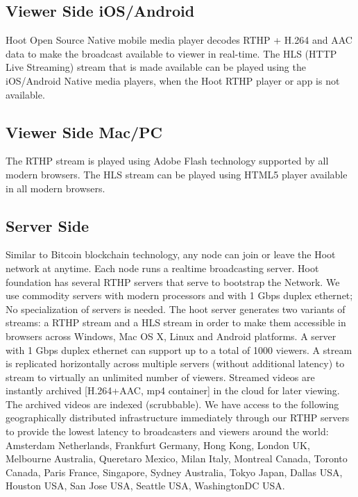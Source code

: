 \subsection{Viewer Side iOS/Android }
 Hoot Open Source Native mobile media player decodes RTHP + H.264 and AAC data to make the broadcast available to viewer in real-time. The HLS (HTTP Live Streaming) stream that is made available can be played using the iOS/Android Native media players, when the Hoot RTHP player or app is not available.

\subsection{Viewer Side Mac/PC} 
The RTHP stream is played using Adobe Flash technology supported by all modern browsers. The HLS stream can be played using HTML5 player available in all modern browsers.

\subsection{Server Side}
Similar to Bitcoin blockchain technology, any node can join or leave the Hoot network at anytime. Each node runs a realtime broadcasting server.
Hoot foundation has several RTHP servers that serve to bootstrap the Network. We use commodity servers with modern processors and with 1 Gbps duplex ethernet;
No specialization of servers is needed. The hoot server generates two variants of streams: a RTHP stream and a HLS stream in order to make them accessible in browsers across Windows, Mac OS X, Linux and Android platforms. A server with 1 Gbps duplex ethernet can support up to a total of 1000 viewers. A stream is replicated horizontally across multiple servers (without additional latency) to stream to virtually an unlimited number of viewers. 
Streamed videos are instantly archived [H.264+AAC, mp4 container] in the cloud for later viewing. The archived videos are indexed (scrubbable). We have access to the following geographically distributed infrastructure immediately through our RTHP servers to provide the lowest latency to broadcasters and viewers around the world: Amsterdam Netherlands, Frankfurt Germany, Hong Kong, London UK, Melbourne Australia, Queretaro Mexico, Milan Italy, Montreal Canada, Toronto Canada, Paris France, Singapore, Sydney Australia, Tokyo Japan, Dallas USA, Houston USA, San Jose USA, Seattle USA, WashingtonDC USA.


